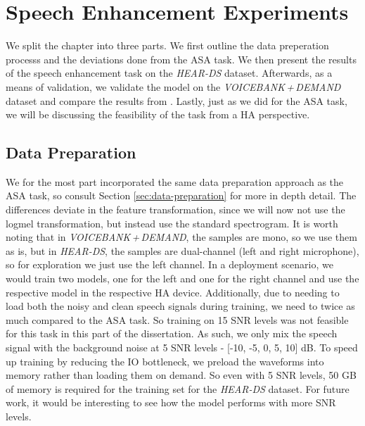 \documentclass[logo,bsc,singlespacing,parskip,online]{infthesis}
\newcommand{\heards}{\textit{HEAR-DS}\xspace}
\newcommand{\vbd}{\textit{VOICEBANK\,+\,DEMAND}\xspace}
\begin{document}
\chapter{Speech Enhancement Experiments}
\label{chap:se-experiments}
We split the chapter into three parts. We first outline the data preperation processs 
and the deviations done from the ASA task. We then present the results of the speech 
enhancement task on the \heards dataset. Afterwards, as a means of validation, we 
validate the model on the \vbd dataset and compare the results from 
\citet{kim_specmix_2021}. Lastly, just as we did for the ASA task, we will be 
discussing the feasibility of the task from a HA perspective.

\section{Data Preparation}
We for the most part incorporated the same data preparation approach as the ASA task, so consult Section \ref{sec:data-preparation} for 
more in depth detail. The differences deviate in the feature transformation, 
since we will now not use the logmel transformation, but instead use the standard 
spectrogram. It is worth noting that in \vbd, the samples 
are mono, so we use them as is, but in \heards, the samples are dual-channel (left and right microphone), 
so for exploration we just use the left channel. In a deployment scenario, we would train two models, one for the left 
and one for the right channel and use the respective model in the respective HA device.
Additionally, due to needing to load both the noisy and clean speech signals 
during training, we need to twice as much compared to the ASA task.
So training on 15 SNR levels was not feasible for this task 
in this part of the dissertation. As such, we only 
mix the speech signal with the background noise at 5 SNR levels - [-10, -5, 0, 5, 10] dB.
To speed up training by reducing the IO bottleneck, we preload the waveforms into memory 
rather than loading them on demand. So even with 5 SNR levels, 
50 GB of memory is required for the training set for the \heards dataset.
For future work, it would be interesting to see how the model performs with 
more SNR levels.
\end{document}
